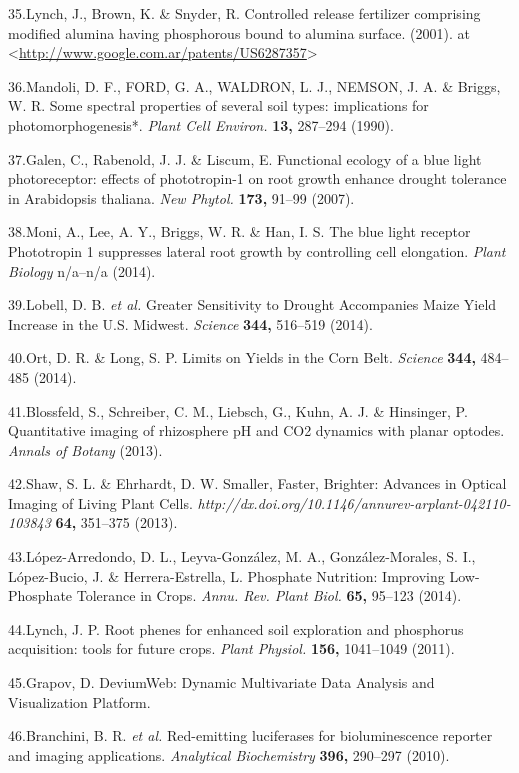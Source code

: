 \documentclass[]{article}
\begin{document}
35.Lynch, J., Brown, K. \& Snyder, R. Controlled release fertilizer
comprising modified alumina having phosphorous bound to alumina surface.
(2001). at
\textless{}\url{http://www.google.com.ar/patents/US6287357}\textgreater{}

36.Mandoli, D. F., FORD, G. A., WALDRON, L. J., NEMSON, J. A. \& Briggs,
W. R. Some spectral properties of several soil types: implications for
photomorphogenesis*. \emph{Plant Cell Environ.} \textbf{13,} 287--294
(1990).

37.Galen, C., Rabenold, J. J. \& Liscum, E. Functional ecology of a blue
light photoreceptor: effects of phototropin-1 on root growth enhance
drought tolerance in Arabidopsis thaliana. \emph{New Phytol.}
\textbf{173,} 91--99 (2007).

38.Moni, A., Lee, A. Y., Briggs, W. R. \& Han, I. S. The blue light
receptor Phototropin 1 suppresses lateral root growth by controlling
cell elongation. \emph{Plant Biology} n/a--n/a (2014).

39.Lobell, D. B. \emph{et al.} Greater Sensitivity to Drought
Accompanies Maize Yield Increase in the U.S. Midwest. \emph{Science}
\textbf{344,} 516--519 (2014).

40.Ort, D. R. \& Long, S. P. Limits on Yields in the Corn Belt.
\emph{Science} \textbf{344,} 484--485 (2014).

41.Blossfeld, S., Schreiber, C. M., Liebsch, G., Kuhn, A. J. \&
Hinsinger, P. Quantitative imaging of rhizosphere pH and CO2 dynamics
with planar optodes. \emph{Annals of Botany} (2013).

42.Shaw, S. L. \& Ehrhardt, D. W. Smaller, Faster, Brighter: Advances in
Optical Imaging of Living Plant Cells.
\emph{http://dx.doi.org/10.1146/annurev-arplant-042110-103843}
\textbf{64,} 351--375 (2013).

43.L{ó}pez-Arredondo, D. L., Leyva-Gonz{á}lez, M. A.,
Gonz{á}lez-Morales, S. I., L{ó}pez-Bucio, J. \& Herrera-Estrella, L.
Phosphate Nutrition: Improving Low-Phosphate Tolerance in Crops.
\emph{Annu. Rev. Plant Biol.} \textbf{65,} 95--123 (2014).

44.Lynch, J. P. Root phenes for enhanced soil exploration and phosphorus
acquisition: tools for future crops. \emph{Plant Physiol.} \textbf{156,}
1041--1049 (2011).

45.Grapov, D. DeviumWeb: Dynamic Multivariate Data Analysis and
Visualization Platform.

46.Branchini, B. R. \emph{et al.} Red-emitting luciferases for
bioluminescence reporter and imaging applications. \emph{Analytical
Biochemistry} \textbf{396,} 290--297 (2010).
\end{document}
